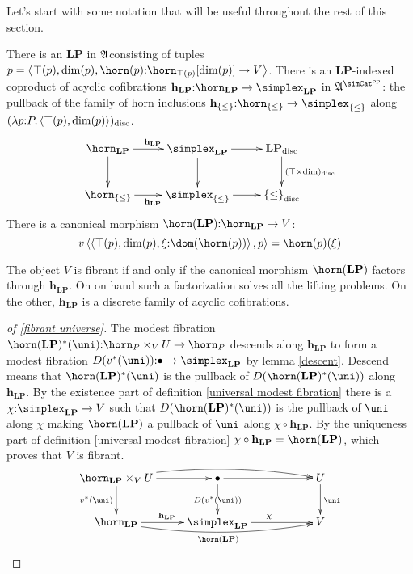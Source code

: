 \documentclass[csh.tex]{subfiles}
\begin{document}
Let's start with some notation that will be useful throughout the rest of this section.
\newcommand\LP{\mathbf{LP}}
\newcommand\foh{\mathbf{h}}
\begin{definition}
There is an  $\LP$ in $\mathfrak A$consisting of tuples $p = \tuplet{\top(p),\dim(p),\horn(p)\of\horn_{\top(p)}[\dim(p)]\to V}$. 
There is an $\LP$-indexed coproduct of acyclic cofibrations $\foh_\LP\of\horn_\LP \to \simplex_\LP$ in $\ambient\s$: the pullback of the family of horn inclusions $\foh_{\set\leq}\of\horn_{\set\leq} \to \simplex_{\set\leq}$ along $(\lambda p\mathord : P .\left\langle \top(p),\dim(p) \right\rangle)_{\rm disc}$.
\[\xymatrix{
\horn_\LP \ar[r]^{\foh_\LP}\ar[d] & \simplex_\LP\ar[d]\ar[r] & \LP\disc\ar[d]^{(\top\times\dim)\disc} \\
\horn_{\set\leq} \ar[r]_{\foh_\LP} & \simplex_{\set\leq}\ar[r] &\set\leq\disc
}\]
There is a canonical morphism $\horn(\LP)\of \horn_\LP\to V$:
\[ v\tuplet{\tuplet{\top(p),\dim(p),\xi\of \dom(\horn(p))},p} = \horn(p)(\xi)\]
\end{definition}

\begin{remark} The object $V$ is fibrant if and only if the canonical morphism $\horn(\LP)$ factors through $\foh_\LP$. On on hand such a factorization solves all the lifting problems. On the other, $\foh_\LP$ is a discrete family of acyclic cofibrations.
\end{remark}

\begin{proof}[of \ref{fibrant universe}]
The modest fibration $\horn(\LP)\ri(\uni)\of \horn_P\times_V U \to \horn_P$ descends along $\foh_\LP$ to form a modest fibration $D(v\ri(\uni))\of \bullet\to\simplex_\LP$ by lemma \ref{descent}. 
Descend means that $\horn(\LP)\ri(\uni)$ is the pullback of $D(\horn(\LP)\ri(\uni))$ along $\foh_\LP$.
By the existence part of definition \ref{universal modest fibration} there is a $\chi\of\simplex_\LP\to V$ such that $D(\horn(\LP)\ri(\uni))$ is the pullback of $\uni$ along $\chi$ making $\horn(\LP)$ a pullback of $\uni$ along $\chi\circ \foh_\LP$. By the uniqueness part of definition \ref{universal modest fibration} $\chi\circ \foh_\LP=\horn(\LP)$, which proves that $V$ is fibrant.
\[\xymatrix{
\horn_\LP\times_V U \ar@/^2ex/[rrr] \ar[r]\ar[d]_{v\ri(\uni)} & \bullet \ar[rr]\ar[d]|{D(v\ri(\uni))} && U\ar[d]^\uni\\
\horn_\LP\ar@/_2ex/[rrr]_{\horn(\LP)}\ar[r]^{\foh_\LP} & \simplex_\LP\ar[rr]^{\chi} && V
}\]
\end{proof}
\end{document}
